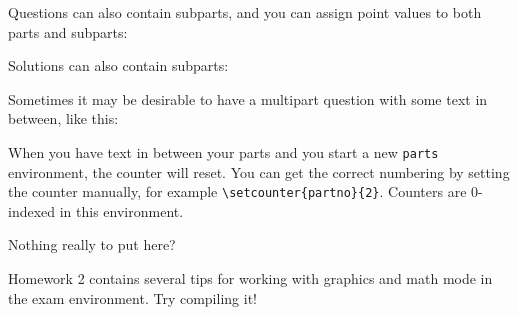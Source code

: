 \begin{questions}
\question[5]
Questions can also contain subparts, and you can assign point values to both parts and subparts:
\begin{solution}[1in]
Solutions can also contain subparts:
\end{solution}

\question[5]
Sometimes it may be desirable to have a multipart question with some text in between, like this:
When you have text in between your parts and you start a new \verb|parts| environment, the counter will reset.
You can get the correct numbering by setting the counter manually, for example \verb|\setcounter{partno}{2}|.
Counters are 0-indexed in this environment.
\begin{solution}[1in]
Nothing really to put here?
\end{solution}
\question[5]
Homework 2 contains several tips for working with graphics and math mode in the exam environment.
Try compiling it!
\end{questions}
